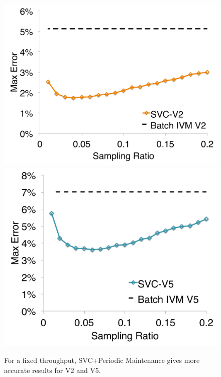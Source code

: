 \begin{figure}[t]
\centering
 \includegraphics[scale=0.12]{exp/con_5.pdf}
 \includegraphics[scale=0.12]{exp/con_6.pdf}
 \caption{For a fixed throughput, SVC+Periodic Maintenance gives more accurate results for V2 and V5. \label{conv-4}} 
\end{figure}

